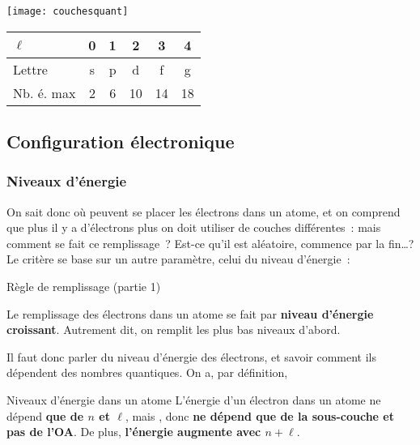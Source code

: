 \documentclass[../main/main.tex]{subfiles}
\begin{document}
\begin{minipage}{0.53\linewidth}
    \begin{center}
        \texttt{[image: couchesquant]}
        \label{fig:couchesquant}
    \end{center}
\end{minipage}
\hfill
\begin{minipage}{0.45\linewidth}
    \centering
    \label{tab:nbelecl}
    \begin{tabular}{lccccc}
        \toprule
        $\ell$ & 0 & 1 & 2 & 3 & 4
        \\\midrule
        Lettre & s & p & d & f & g
        \\\midrule
        Nb. é. max & 2 & 6 & 10 & 14 & 18
        \\\bottomrule
    \end{tabular}
\end{minipage}

\subsection{Configuration électronique}
\subsubsection{Niveaux d'énergie}
On sait donc où peuvent se placer les électrons dans un atome, et on comprend
que plus il y a d'électrons plus on doit utiliser de couches différentes~: mais
comment se fait ce remplissage~? Est-ce qu'il est aléatoire, commence par la
fin…? Le critère se base sur un autre paramètre, celui du niveau d'énergie~:

\begin{tprop}{Règle de remplissage (partie 1)}
    \begin{center}
        Le remplissage des électrons dans un atome se fait par \textbf{niveau
        d'énergie croissant}. Autrement dit, on remplit les plus bas niveaux
        d'abord.
    \end{center}
\end{tprop}

Il faut donc parler du niveau d'énergie des électrons, et savoir comment ils
dépendent des nombres quantiques. On a, par définition,

\begin{tdefi}{Niveaux d'énergie dans un atome}
    L'énergie d'un électron dans un atome ne dépend \textbf{que de $n$ et
    $\ell$}, mais , donc \textbf{ne dépend que
    de la sous-couche et pas de l'OA}. \bigbreak
    De plus, \textbf{l'énergie augmente avec $n+\ell$}.
\end{tdefi}
\end{document}
